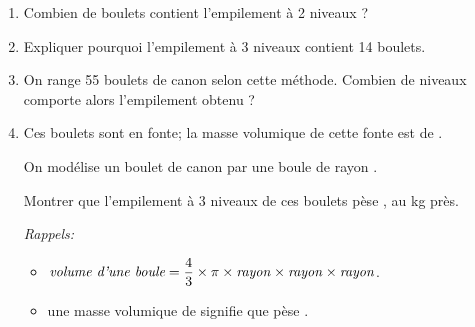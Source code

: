 \begin{enumerate}
	\item Combien de boulets contient l'empilement à 2 niveaux ?	
	\item Expliquer pourquoi l'empilement à 3 niveaux contient 14 boulets.	
	\item On range 55 boulets de canon selon cette méthode. Combien de niveaux comporte alors l'empilement obtenu ?	
	\item Ces boulets sont en fonte; la masse volumique de cette fonte est de .
	
On modélise un boulet de canon par une boule de rayon .
	
Montrer que l'empilement à 3 niveaux de ces boulets pèse , au kg près.
	
\emph{Rappels:}
\begin{itemize}
		\item $\emph{volume d'une boule} = \dfrac{4}{3}\times \pi \times \text{\emph{rayon}} \times \text{\emph{rayon}} \times \text{\emph{rayon}}$.	
		\item une masse volumique de  signifie que  pèse .
\end{itemize}
\end{enumerate}
 
\vspace{0,5cm}


